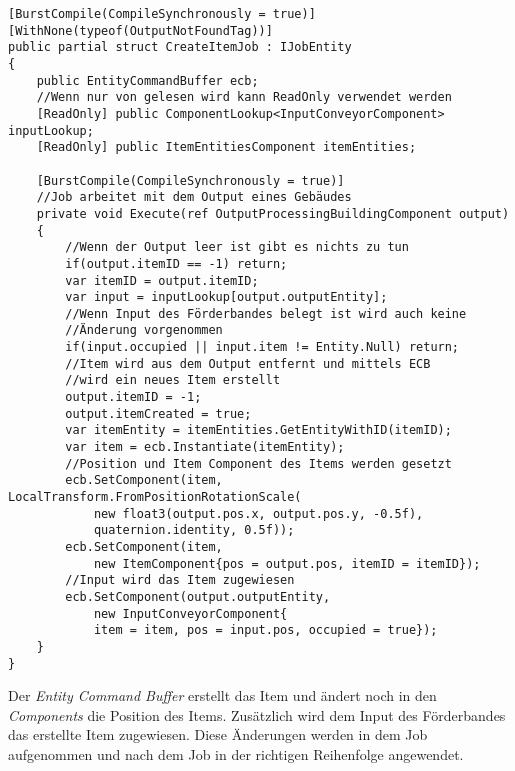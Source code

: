 \begin{lstlisting}[style=code, caption={Create Item Job}]
[BurstCompile(CompileSynchronously = true)]
[WithNone(typeof(OutputNotFoundTag))]
public partial struct CreateItemJob : IJobEntity
{
    public EntityCommandBuffer ecb;
    //Wenn nur von gelesen wird kann ReadOnly verwendet werden
    [ReadOnly] public ComponentLookup<InputConveyorComponent> inputLookup;
    [ReadOnly] public ItemEntitiesComponent itemEntities;

    [BurstCompile(CompileSynchronously = true)]
    //Job arbeitet mit dem Output eines Gebäudes
    private void Execute(ref OutputProcessingBuildingComponent output)
    {
        //Wenn der Output leer ist gibt es nichts zu tun
        if(output.itemID == -1) return;
        var itemID = output.itemID;
        var input = inputLookup[output.outputEntity];
        //Wenn Input des Förderbandes belegt ist wird auch keine
        //Änderung vorgenommen
        if(input.occupied || input.item != Entity.Null) return;
        //Item wird aus dem Output entfernt und mittels ECB
        //wird ein neues Item erstellt 
        output.itemID = -1;
        output.itemCreated = true;
        var itemEntity = itemEntities.GetEntityWithID(itemID);
        var item = ecb.Instantiate(itemEntity);
        //Position und Item Component des Items werden gesetzt
        ecb.SetComponent(item, LocalTransform.FromPositionRotationScale(
            new float3(output.pos.x, output.pos.y, -0.5f),
            quaternion.identity, 0.5f));
        ecb.SetComponent(item,
            new ItemComponent{pos = output.pos, itemID = itemID});
        //Input wird das Item zugewiesen
        ecb.SetComponent(output.outputEntity,
            new InputConveyorComponent{
            item = item, pos = input.pos, occupied = true});
    }
}
\end{lstlisting}
Der \textit{Entity Command Buffer} erstellt das Item und ändert noch in den \textit{Components} die Position des Items. Zusätzlich wird dem Input des Förderbandes das erstellte Item zugewiesen. Diese Änderungen werden in dem Job aufgenommen und nach dem Job in der richtigen Reihenfolge angewendet.